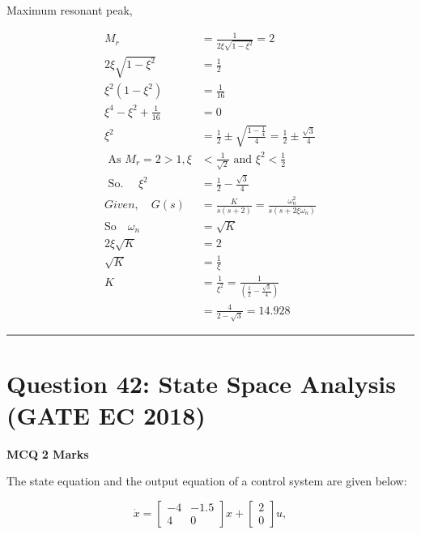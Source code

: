 \documentclass[11pt,a4paper]{article}
\begin{document}
\begin{tcolorbox}[solbox, title=Detailed Solution -- Question 41]
Maximum resonant peak, 

\[
\begin{aligned} M_{r} &=\frac{1}{2 \xi \sqrt{1-\xi^{2}}}=2 \\ 2 \xi \sqrt{1-\xi^{2}} &=\frac{1}{2} \\ \xi^{2}\left(1-\xi^{2}\right) &=\frac{1}{16} \\ \xi^{4}-\xi^{2}+\frac{1}{16} &=0 \\ \xi^{2}&=\frac{1}{2} \pm \sqrt{\frac{1-\frac{1}{4}}{4}}=\frac{1}{2} \pm \frac{\sqrt{3}}{4} \\ \text { As } M_{r}=2 > 1, \xi& < \frac{1}{\sqrt{2}} \text { and } \xi^{2} < \frac{1}{2} \\ \text { So. } \quad\xi^{2}&=\frac{1}{2}-\frac{\sqrt{3}}{4}\\ Given, \quad G(s)&=\frac{K}{s(s+2)}=\frac{\omega_{n}^{2}}{s\left(s+2 \xi \omega_{n}\right)} \\ \text{So} \quad\omega_{n} &=\sqrt{K} \\ 2 \xi \sqrt{K} &=2\\ \sqrt{K} &=\frac{1}{\xi} \\ K &=\frac{1}{\xi^{2}}=\frac{1}{\left(\frac{1}{2}-\frac{\sqrt{3}}{4}\right)} \\ &=\frac{4}{2-\sqrt{3}}=14.928 \end{aligned}
\]
\end{tcolorbox}

\vspace{1.5em}
\hrule
\vspace{1.5em}

\section*{Question 42: State Space Analysis (GATE EC 2018)}
\noindent \textbf{\color{primary}MCQ} \hfill \textbf{\color{secondary}2 Marks}


\noindent The state equation and the output equation of a control system are given below:

\[
\dot{x}=\begin{bmatrix} -4 & -1.5\\ 4 & 0 \end{bmatrix}x+\begin{bmatrix} 2\\ 0\end{bmatrix}u,
\]
 
\end{document}
